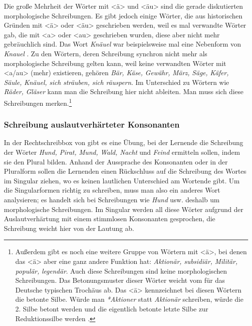 Die große Mehrheit der Wörter mit <ä> und <äu> sind die gerade diskutierten morphologische Schreibungen. Es gibt jedoch einige Wörter, die aus historischen Gründen mit <ä> oder <äu> geschrieben werden, \zB weil es mal verwandte Wörter gab, die mit <a> oder <au> geschrieben wurden, diese aber nicht mehr gebräuchlich sind. Das Wort \textit{Knäuel} war beispielsweise mal eine Nebenform von \textit{Knauel} \citep{Grimm2020}. Zu den Wörtern, deren Schreibung synchron nicht mehr als morphologische Schreibung gelten kann, weil keine verwandten Wörter mit <a/au> (mehr) existieren, gehören \textit{Bär, Käse, Gewähr, März, Säge, Käfer, Säule, Knäuel, sich sträuben, sich räuspern}. Im Unterschied zu Wörtern wie \textit{Räder, Gläser} kann man die Schreibung hier nicht ableiten. Man muss sich diese Schreibungen merken.\footnote{Außerdem gibt es noch eine weitere Gruppe von Wörtern mit <ä>, bei denen das <ä> aber eine ganz andere Funktion hat: \textit{Aktionär, subsidiär, Militär, populär, legendär}. Auch diese Schreibungen sind keine morphologischen Schreibungen. Das Betonungsmuster dieser Wörter weicht vom für das Deutsche typischen Trochäus ab. Das <ä> kennzeichnet bei diesen Wörtern die betonte Silbe. Würde man \zB \textit{*Aktioner} statt \textit{Aktionär} schreiben, würde die 2. Silbe betont werden und die eigentlich betonte letzte Silbe zur Reduktionssilbe werden \citep[231f]{FuhrhopPeters2013}.}
 

\subsubsection{Schreibung auslautverhärteter Konsonanten}

In der Rechtschreibbox von \citet[32/2]{Lessmann2009} gibt es eine Übung, bei der Lernende die Schreibung der Wörter \textit{Hund, Pirat, Mund, Wald, Nacht} und \textit{Feind} ermitteln sollen, indem sie den Plural bilden. Anhand der Aussprache des Konsonanten \textipa{[d]} oder \textipa{[t]} in der Pluralform sollen die Lernenden einen Rückschluss auf die Schreibung des Wortes im Singular ziehen, wo es keinen lautlichen Unterschied am Wortende gibt. Um die Singularformen richtig zu schreiben, muss man also ein anderes Wort analysieren; es handelt sich bei Schreibungen wie \textit{Hund} usw. deshalb um morphologische Schreibungen. Im Singular werden all diese Wörter aufgrund der Auslautverhärtung mit einem stimmlosen Konsonanten gesprochen, die Schreibung weicht hier von der Lautung ab.

